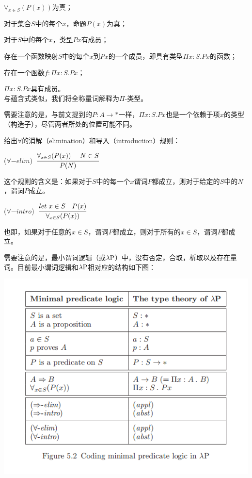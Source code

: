 \documentclass[UTF8]{article}
\begin{document}
		$\forall_{x\in S}(P(x))$为真；
		
		对于集合$S$中的每个$x$，命题$P(x)$为真；
		
		对于$S$中的每个$x$，类型$Px$有成员；
		
		存在一个函数映射$S$中的每个$x$到$Px$的一个成员，即具有类型$\Pi x:S.Px$的函数；
	
		存在一个函数$f:\Pi x:S.Px$；
		
		$\Pi x:S.Px$具有成员。\\
		
		与蕴含式类似，我们将全称量词解释为$\Pi$-类型。
		
		需要注意的是，与前文提到的$P:A\rightarrow*$一样，$\Pi x:S.Px$也是一个依赖于项$x$的类型（构造子），尽管两者所处的位置可能不同。
		
		给出$\forall$的消解（elimination）和导入（introduction）规则：
		
		($\forall-elim$)\ $\cfrac{\forall_{x\in S}(P(x))\ \ \ \ N\in S}{P(N)}$
		
		这个规则的含义是：如果对于$S$中的每一个$x$谓词$P$都成立，则对于给定的$S$中的$N$，谓词$P$成立。
		
		($\forall-intro$)\ $\cfrac{let\ x\in S\ \ \ P(x)}{\forall_{x\in S}(P(x))}$
		
		也即，如果对于任意的$x\in S$，谓词$P$都成立，则对于所有的$x\in S$，谓词$P$都成立。
		
		需要注意的是，最小谓词逻辑（或$\lambda{\rm P}$）中，没有否定，合取，析取以及存在量词。目前最小谓词逻辑和$\lambda{\rm P}$相对应的结构如下图：
		
		\includegraphics[width=0.93\linewidth]{"../imgs/5-9.png"}
		
\end{document}
